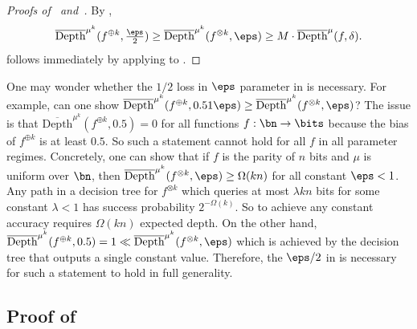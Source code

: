 \documentclass[11pt]{article}
\begin{document}
\begin{proof}[Proofs of~ and~]
    By , $$\overline{\mathrm{Depth}}^{\mu^{k}}(f^{\oplus k},\tfrac{\eps}{2})\ge \overline{\mathrm{Depth}}^{\mu^{k}}(f^{\otimes k},\eps)\ge M\cdot\overline{\mathrm{Depth}}^{\mu}(f,\delta).$$
     follows immediately by applying  to .
\end{proof}

\begin{remark}
    \label{rem:loss}
    One may wonder whether the $1/2$ loss in $\eps$ parameter in  is necessary. For example, can one show $\overline{\mathrm{Depth}}^{\mu^{k}}(f^{\oplus k},0.51\eps)\ge \overline{\mathrm{Depth}}^{\mu^{k}}(f^{\otimes k},\eps)$? The issue is that $\overline{\mathrm{Depth}}^{\mu^{k}}(f^{\oplus k},0.5)=0$ for all functions $f:\bn\to\bits$ because the bias of $f^{\oplus k}$ is at least $0.5$. So such a statement cannot hold for all $f$ in all parameter regimes. Concretely, one can show that if $f$ is the parity of $n$ bits and $\mu$ is uniform over $\bn$, then $\overline{\mathrm{Depth}}^{\mu^{k}}(f^{\otimes k},\eps)\ge \Omega(kn)$ for all constant $\eps<1$. Any path in a decision tree for $f^{\otimes k}$ which queries at most $\lambda kn$ bits for some constant $\lambda<1$ has success probability $2^{-\Omega(k)}$. So to achieve any constant accuracy requires $\Omega(kn)$ expected depth. On the other hand, $\overline{\mathrm{Depth}}^{\mu^{k}}(f^{\oplus k},0.5)=1\ll \overline{\mathrm{Depth}}^{\mu^{k}}(f^{\otimes k},\eps)$ which is achieved by the decision tree that outputs a single constant value. Therefore, the $\eps/2$ in  is necessary for such a statement to hold in full generality.
\end{remark}



\subsection{Proof of~}


\end{document}
